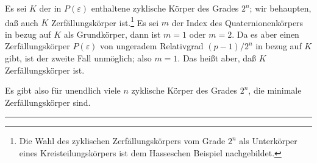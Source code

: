 Es sei $K$ der in $P(\varepsilon)$ enthaltene zyklische Körper des Grades $2^n$; wir behaupten, daß auch $K$ Zerfällungskörper ist.\footnote{Die Wahl des zyklischen Zerfällungskörpers vom Grade $2^n$ als Unterkörper eines Kreisteilungskörpers ist dem Hasseschen Beispiel nachgebildet.} Es sei $m$ der Index des Quaternionenkörpers in bezug auf $K$ als Grundkörper, dann ist $m=1$ oder $m=2$. Da es aber einen Zerfällungskörper $P(\varepsilon)$ von ungeradem Relativgrad $(p-1)/2^n$ in bezug auf $K$ gibt, ist der zweite Fall unmöglich; also $m=1$. Das heißt aber, daß $K$ Zerfällungskörper ist.

Es gibt also für unendlich viele $n$ zyklische Körper des Grades $2^n$, die minimale Zerfällungskörper sind.

\begin{center}
\rule{7em}{0.4pt}
\end{center}

\clearpage
\setcounter{footnote}{0}

